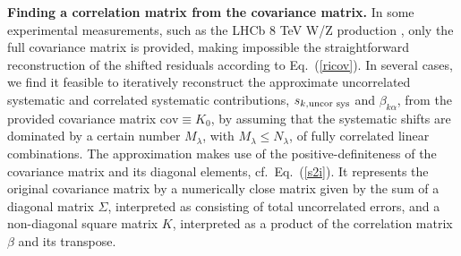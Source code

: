 {\bf Finding a correlation matrix from the covariance matrix.} In some experimental measurements, such as the LHCb 8 TeV W/Z production \cite{Aaij:2015zlq},
only the full covariance matrix is provided, making impossible the straightforward
reconstruction of the shifted residuals according to Eq.~(\ref{ricov}).
%
In several cases, we find it feasible to iteratively reconstruct the
approximate uncorrelated systematic and correlated systematic contributions,
$s_{k,\mbox{\scriptsize uncor sys}}$ and $\beta_{k\alpha}$, from the
provided covariance matrix $\mbox{cov}\equiv K_{0}$, by assuming
that the systematic shifts are dominated by a certain number $M_{\lambda}$,
with $M_{\lambda}\leq N_{\lambda}$, of fully correlated linear combinations.
The approximation makes use of the positive-definiteness of the covariance
matrix and its diagonal elements, cf.~Eq.~(\ref{s2i}). It represents
the original covariance matrix by a numerically close matrix
given by the sum of a diagonal matrix $\Sigma$, interpreted as consisting of total uncorrelated errors, and a non-diagonal square matrix $K$, interpreted as a product of the correlation matrix $\beta$ and its transpose.

